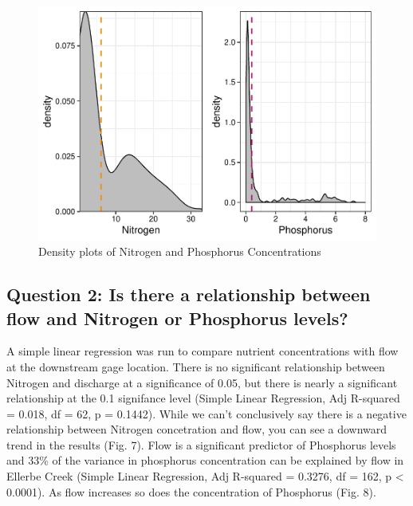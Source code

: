 \documentclass[12pt,]{article}
\begin{document}
\newpage

\begin{figure}
\centering
\includegraphics{Landman_ENV872_Project_files/figure-latex/Data Analysis Figure 6-1.pdf}
\caption{Density plots of Nitrogen and Phosphorus Concentrations}
\end{figure}

\newpage

\hypertarget{question-2-is-there-a-relationship-between-flow-and-nitrogen-or-phosphorus-levels}{%
\subsection{Question 2: Is there a relationship between flow and
Nitrogen or Phosphorus
levels?}\label{question-2-is-there-a-relationship-between-flow-and-nitrogen-or-phosphorus-levels}}

A simple linear regression was run to compare nutrient concentrations
with flow at the downstream gage location. There is no significant
relationship between Nitrogen and discharge at a significance of 0.05,
but there is nearly a significant relationship at the 0.1 signifance
level (Simple Linear Regression, Adj R-squared = 0.018, df = 62, p =
0.1442). While we can't conclusively say there is a negative
relationship between Nitrogen concetration and flow, you can see a
downward trend in the results (Fig. 7). Flow is a significant predictor
of Phosphorus levels and 33\% of the variance in phosphorus
concentration can be explained by flow in Ellerbe Creek (Simple Linear
Regression, Adj R-squared = 0.3276, df = 162, p \textless{} 0.0001). As
flow increases so does the concentration of Phosphorus (Fig. 8).
\end{document}
